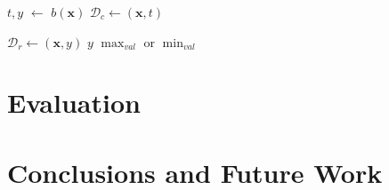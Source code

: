 \documentclass[10pt,conference,a4paper]{IEEEtran}
\begin{document}



\begin{algorithm}
\footnotesize

\caption{$f(\mathbf{x})$}\label{ourf}
\begin{algorithmic}[1]
\State $t,y$ $\gets$ $b(\mathbf{x})$
\State$\mathcal{D}_{c} \gets (\mathbf{x},t)$  

	\State$\mathcal{D}_{r} \gets (\mathbf{x},y)$ 
 \EndIf
	\State \Return $y$ 
  \Else
	\State \Return $\max_{val}$ or $\min_{val}$
 \EndIf 
\end{algorithmic}
\end{algorithm}



\section{Evaluation}
\label{evaluation}


\section{Conclusions and Future Work}

 



%
\end{document}
